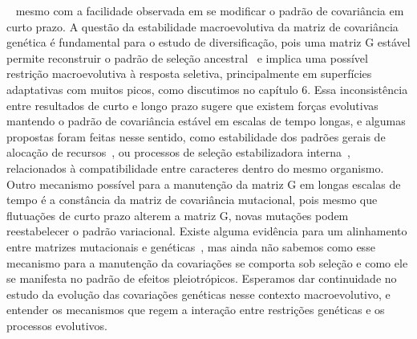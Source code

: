 \begin{refsection}
~\parencite{Porto2009-pi, Marroig2001-ne, McGlothlin2018-hm, Steppan1997-oa,
Garant2008-wv} mesmo com a facilidade observada em se modificar o padrão de
covariância em curto prazo. A questão da estabilidade macroevolutiva da matriz
de covariância genética é fundamental para o estudo de diversificação, pois
uma matriz G estável permite reconstruir o padrão de seleção
ancestral~\parencite{Jones2004-be} e implica uma possível restrição
macroevolutiva à resposta seletiva, principalmente em superfícies adaptativas
com muitos picos, como discutimos no capítulo 6. Essa inconsistência entre
resultados de curto e longo prazo sugere que existem forças evolutivas
mantendo o padrão de covariância estável em escalas de tempo longas, e algumas
propostas foram feitas nesse sentido, como estabilidade dos padrões gerais de
alocação de recursos~\parencite{Bjorklund2004-tp}, ou processos de seleção
estabilizadora interna~\parencite{Cheverud1984-mi}, relacionados à
compatibilidade entre caracteres dentro do mesmo organismo. Outro mecanismo
possível para a manutenção da matriz G em longas escalas de tempo é a
constância da matriz de covariância mutacional, pois mesmo que flutuações de
curto prazo alterem a matriz G, novas mutações podem reestabelecer o padrão
variacional. Existe alguma evidência para um alinhamento entre matrizes
mutacionais e genéticas~\parencite{Houle2017-ph}, mas ainda não sabemos como
esse mecanismo para a manutenção da covariações se comporta sob seleção e como
ele se manifesta no padrão de efeitos pleiotrópicos. Esperamos dar
continuidade no estudo da evolução das covariações genéticas nesse contexto
macroevolutivo, e entender os mecanismos que regem a interação entre
restrições genéticas e os processos evolutivos.


\printbibliography


\end{refsection}